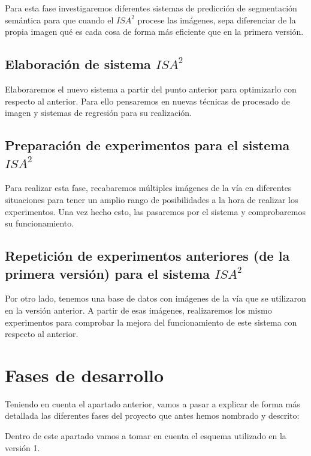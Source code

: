\documentclass[12pt,oneside,a4paper]{article}
\begin{document}
Para esta fase investigaremos diferentes sistemas de predicción de segmentación semántica para que cuando el $ISA^2$ procese las imágenes, sepa diferenciar de la propia imagen qué es cada cosa de forma más eficiente que en la primera versión.
\subsection{Elaboración de sistema $ISA^2$}

Elaboraremos el nuevo sistema a partir del punto anterior para optimizarlo con respecto al anterior. Para ello pensaremos en nuevas técnicas de procesado de imagen y sistemas de regresión para su realización.
\subsection{Preparación de experimentos para el sistema $ISA^2$}

Para realizar esta fase, recabaremos múltiples imágenes de la vía en diferentes situaciones para tener un amplio rango de posibilidades a la hora de realizar los experimentos. Una vez hecho esto, las pasaremos por el sistema y comprobaremos su funcionamiento.

\subsection{Repetición de experimentos anteriores (de la primera versión) para el sistema $ISA^2$}

Por otro lado, tenemos una base de datos con imágenes de la vía que se utilizaron en la versión anterior. A partir de esas imágenes, realizaremos los mismo experimentos para comprobar la mejora del funcionamiento de este sistema con respecto al anterior.

\section{Fases de desarrollo}

Teniendo en cuenta el apartado anterior, vamos a pasar a explicar de forma más detallada las diferentes fases del proyecto que antes hemos nombrado y descrito:

Dentro de este apartado vamos a tomar en cuenta el esquema utilizado en la versión 1.
\end{document}
